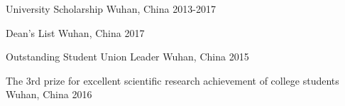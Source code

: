 

\begin{cvhonors}

  \cvhonor
    {University Scholarship} %
    {Wuhan, China} %
    {2013-2017} %

  \cvhonor
    {Dean's List} %
    {Wuhan, China} %
    {2017} %

  \cvhonor
    {Outstanding Student Union Leader} %
    {Wuhan, China} %
    {2015} %

  \cvhonor
    {The 3rd prize for excellent scientific research achievement of college students} %
    {Wuhan, China} %
    {2016} %
\end{cvhonors}
